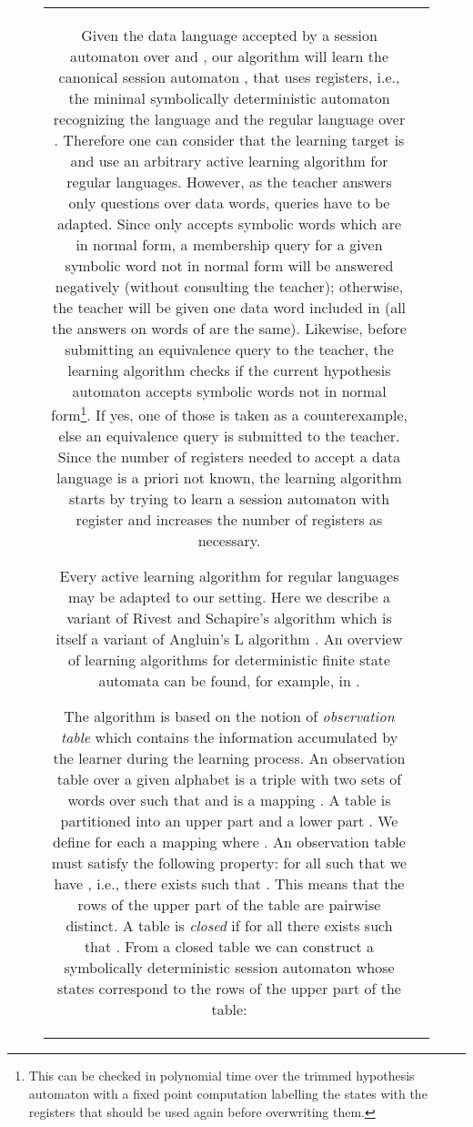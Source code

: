 \documentclass{LMCS}
\begin{document}
\begin{figure}[t]
\begin{tabular}{cc}
Given the data language  accepted by a session automaton 
over  and , our algorithm will learn the canonical session
automaton , that uses  registers, i.e., the minimal
symbolically deterministic automaton recognizing the language 
and the regular language  over .  Therefore one can consider that the learning target is
 and use an arbitrary active learning algorithm for
regular languages. However, as the teacher answers only questions over
data words, queries have to be adapted. Since  only accepts
symbolic words which are in normal form, a membership query for a
given symbolic word  not in normal form will be answered negatively
(without consulting the teacher); otherwise, the teacher will be given
one data word included in  (all the answers on words of
 are the same).  Likewise, before submitting an equivalence
query to the teacher, the learning algorithm checks if the current
hypothesis automaton accepts symbolic words not in normal
form\footnote{This can be checked in polynomial time over the trimmed
  hypothesis automaton with a fixed point computation labelling the
  states with the registers that should be used again before
  overwriting them.}. If yes, one of those is taken as a
counterexample, else an equivalence query is submitted to the
teacher. Since the number of registers needed to accept a data
language is a priori not known, the learning algorithm starts by
trying to learn a session automaton with  register and increases
the number of registers as necessary.

Every active learning algorithm for regular languages may be adapted
to our setting.  Here we describe a variant of Rivest and Schapire's
algorithm \cite{RiSh:inference} which is itself a variant of Angluin's
L algorithm \cite{Angluin:regset}.  An overview of learning
algorithms for deterministic finite state automata can be found, for
example, in \cite{BergR05}.

The algorithm is based on the notion of \emph{observation table} which
contains the information accumulated by the learner during the
learning process.  An observation table over a given alphabet  is a triple  with  two
sets of words over  such that  and  is a mapping .  A table is
partitioned into an upper part  and a lower part .  We define for each  a mapping  where .  An observation table
must satisfy the following property: for all  such that  we have , i.e., there exists 
such that . This means that the rows of the
upper part of the table are pairwise distinct.  A table is
\emph{closed} if for all 
there exists  such that .  From a closed
table we can construct a symbolically deterministic session automaton
whose states correspond to the rows of the upper part of the table:


\end{tabular}
\end{figure}
\end{document}
